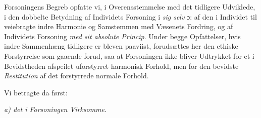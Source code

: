 Forsoningens Begreb opfatte vi, i Overensstemmelse med det tidligere Udviklede, i
den dobbelte Betydning af Individets Forsoning i \emph{sig selv} ɔ: af den i
Individet til\-%
veiebragte indre Harmonie og Samstemmen med Væsenets Fordring, og af Individets
Forsoning \emph{med sit absolute Princip}. Under begge Opfattelser, hvis indre
Sammenhæng tidligere er bleven paaviist, forudsættes her den ethiske Forstyrrelse
som gaaende forud, saa at Forsoningen ikke bliver Udtrykket for et i Bevidstheden
afspeilet uforstyrret harmonisk Forhold, men for den bevidste \emph{Restitution}
af det forstyrrede normale Forhold.

Vi betragte da først:

\begin{center}
\emph{a) det i Forsoningen Virksomme.}
\end{center}

